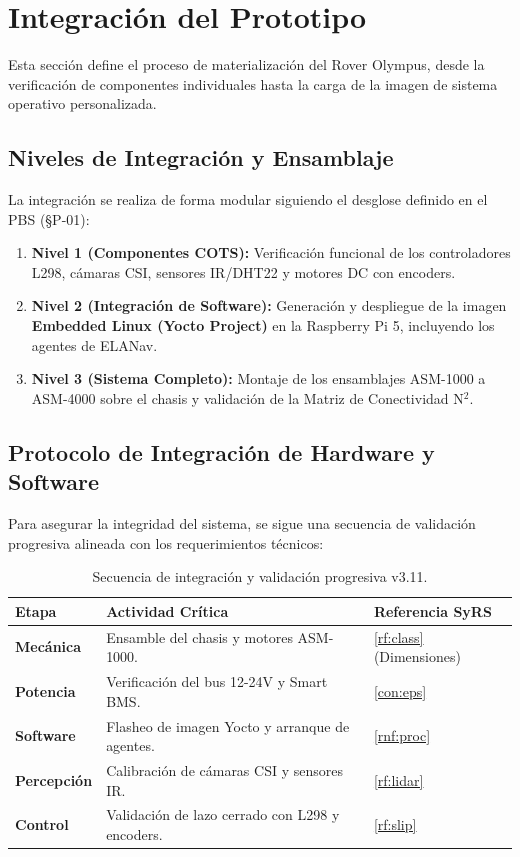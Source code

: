 
\section{Integración del Prototipo}

Esta sección define el proceso de materialización del Rover Olympus, desde la verificación de componentes individuales hasta la carga de la imagen de sistema operativo personalizada.

\subsection{Niveles de Integración y Ensamblaje}
La integración se realiza de forma modular siguiendo el desglose definido en el PBS (§P-01):

\begin{enumerate}
    \item \textbf{Nivel 1 (Componentes COTS):} Verificación funcional de los controladores L298, cámaras CSI, sensores IR/DHT22 y motores DC con encoders.
    \item \textbf{Nivel 2 (Integración de Software):} Generación y despliegue de la imagen \textbf{Embedded Linux (Yocto Project)} en la Raspberry Pi 5, incluyendo los agentes de ELANav.
    \item \textbf{Nivel 3 (Sistema Completo):} Montaje de los ensamblajes ASM-1000 a ASM-4000 sobre el chasis y validación de la Matriz de Conectividad N$^2$.
\end{enumerate}

\subsection{Protocolo de Integración de Hardware y Software}
Para asegurar la integridad del sistema, se sigue una secuencia de validación progresiva alineada con los requerimientos técnicos:

\begin{table}[H]
    \centering
    \caption{Secuencia de integración y validación progresiva v3.11.}
    \scriptsize
    \begin{tabularx}{\textwidth}{|l|X|l|}
        \hline
        \rowcolor{AgencyBlue!10} \textbf{Etapa} & \textbf{Actividad Crítica} & \textbf{Referencia SyRS} \\ \hline
        \textbf{Mecánica} & Ensamble del chasis y motores ASM-1000. & \cref{rf:class} (Dimensiones) \\ \hline
        \textbf{Potencia} & Verificación del bus 12-24V y Smart BMS. & \cref{con:eps} \\ \hline
        \textbf{Software} & Flasheo de imagen Yocto y arranque de agentes. & \cref{rnf:proc} \\ \hline
        \textbf{Percepción} & Calibración de cámaras CSI y sensores IR. & \cref{rf:lidar} \\ \hline
        \textbf{Control} & Validación de lazo cerrado con L298 y encoders. & \cref{rf:slip} \\ \hline
    \end{tabularx}
\end{table}

